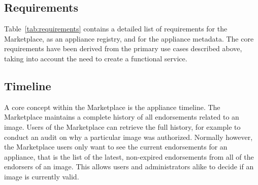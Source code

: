\subsection{Requirements}

Table~\ref{tab:requirements} contains a detailed list of requirements
for the Marketplace, as an appliance registry, and for the appliance
metadata.  The core requirements have been derived from the primary
use cases described above, taking into account the need to create a
functional service.  

\subsection{Timeline}

A core concept within the Marketplace is the appliance timeline.  The
Marketplace maintains a complete history of all endorsements related
to an image.  Users of the Marketplace can retrieve the full history,
for example to conduct an audit on why a particular image was
authorized.  Normally however, the Marketplace users only want to see
the current endorsements for an appliance, that is the list of the
latest, non-expired endorsements from all of the endorsers of an
image.  This allows users and administrators alike to decide if an
image is currently valid.  

